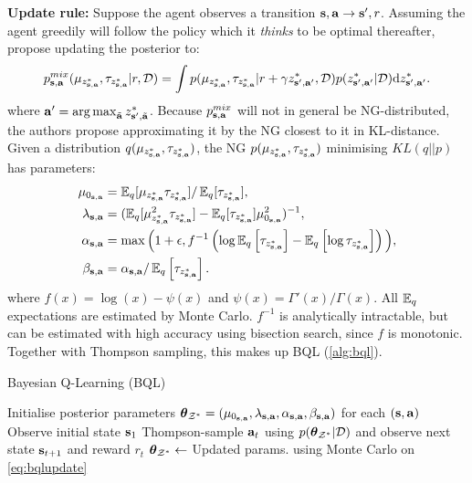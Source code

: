 \documentclass{article}
\begin{document}
\begin{appendices}
\textbf{Update rule:} Suppose the agent observes a transition $\s, \ac \to \ns, r$. Assuming the agent greedily will follow the policy which it \textit{thinks} to be optimal thereafter, \cite{bqlearning} propose updating the posterior to:
\begin{align}\label{eq:mixture}
p^{mix}_{\s, \ac}(\bqlmu, \bqltau | r, \data) = \int p(\bqlmu, \bqltau | r + \gamma \zonb, \data) p(\zonb | \data) \dint \zonb.
\end{align}
where $\ac' = \argmax_{\tilde{\ac}} z^*_{\ns, \tilde{\ac}}$. Because $p^{mix}_{\s, \ac}$ will not in general be NG-distributed, the authors propose approximating it by the NG closest to it in KL-distance. Given a distribution $q(\bqlmu, \bqltau)$, the NG $p(\bqlmu, \bqltau)$ minimising $KL(q || p)$ has parameters:
\begin{equation}
\begin{aligned} \label{eq:bqlupdate}
\bqlmuzero &= \E_q[\bqlmu \bqltau] / \E_q[\bqltau], \\
\bqllambda &= (\E_q[\bqlmu^2 \bqltau] - \E_q[\bqltau] \mu_{0_{\s, \ac}}^2)^{-1},\\
\bqlalpha &= \max \Big(1 + \epsilon, f^{-1}\rdb{\log \E_q\sqb{\bqltau} - \E_q\sqb{\log \bqltau}}\Big), \\
\bqlbeta &= \bqlalpha / \E_q\sqb{\bqltau}.
\end{aligned}
\end{equation}
where $f(x) = \log(x) - \psi(x)$ and $\psi(x) = \Gamma'(x) / \Gamma(x)$. All $\E_q$ expectations are estimated by Monte Carlo. $f^{-1}$ is analytically intractable, but can be estimated with high accuracy using bisection search, since $f$ is monotonic. Together with Thompson sampling, this makes up BQL (\cref{alg:bql}).

\begin{algorithm}
  \caption{Bayesian Q-Learning (BQL)}\label{alg:bql}
  \begin{algorithmic}[1]
\State Initialise posterior parameters $\thetamczo = (\mu_{0_{\s, \ac}}, \lambda_{\s, \ac}, \alpha_{\s, \ac}, \beta_{\s, \ac})$ for each $(\s, \ac)$
 \State Observe initial state $\s_1$
  \State Thompson-sample $\ac_t$ using $p(\thetamczo | \data)$ and observe next state $\s_{t+1}$ and reward $r_t$
  \State $\thetamczo \leftarrow $ Updated params. using Monte Carlo on \cref{eq:bqlupdate}
 \EndFor
  \end{algorithmic}
\end{algorithm}


\end{appendices}
\end{document}
